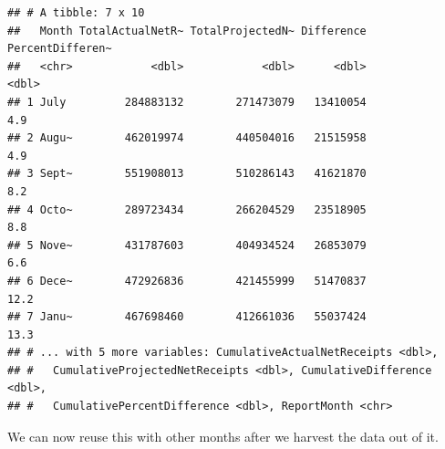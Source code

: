 \documentclass[]{book}
\begin{document}
\begin{verbatim}
## # A tibble: 7 x 10
##   Month TotalActualNetR~ TotalProjectedN~ Difference PercentDifferen~
##   <chr>            <dbl>            <dbl>      <dbl>            <dbl>
## 1 July         284883132        271473079   13410054              4.9
## 2 Augu~        462019974        440504016   21515958              4.9
## 3 Sept~        551908013        510286143   41621870              8.2
## 4 Octo~        289723434        266204529   23518905              8.8
## 5 Nove~        431787603        404934524   26853079              6.6
## 6 Dece~        472926836        421455999   51470837             12.2
## 7 Janu~        467698460        412661036   55037424             13.3
## # ... with 5 more variables: CumulativeActualNetReceipts <dbl>,
## #   CumulativeProjectedNetReceipts <dbl>, CumulativeDifference <dbl>,
## #   CumulativePercentDifference <dbl>, ReportMonth <chr>
\end{verbatim}

We can now reuse this with other months after we harvest the data out of it.
\end{document}
